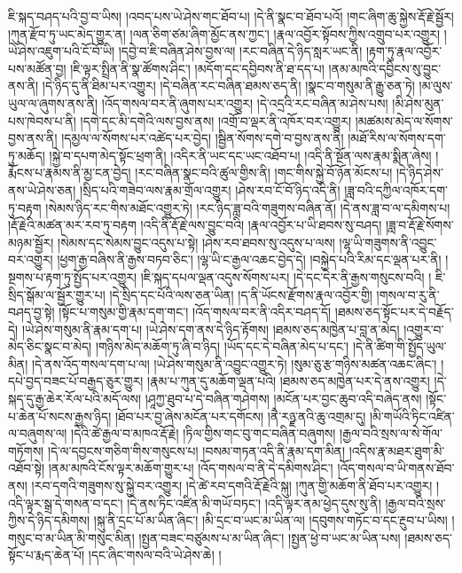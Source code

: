 ཇི་སྐད་བཤད་པའི་བྱ་བ་ཡིས། །འབད་པས་ཡེ་ཤེས་གང་ཐོབ་པ། །དེ་ནི་སྣང་བ་ཐོབ་པའོ། །གང་ཞིག་ཆུ་སྐྱེས་རྡོ་རྗེ་སྦྱོར། །ཀུན་རྫོབ་ཏུ་ཡང་མེད་གྱུར་ན། །ལན་ཅིག་ཙམ་ཞིག་མྱོང་ནས་ཀྱང་། །རྣལ་འབྱོར་སྟོབས་ཀྱིས་འགྲུབ་པར་འགྱུར། །ཡེ་ཤེས་འཇུག་པའི་ངོ་བོ་ཡི། །དབྱེ་བ་ཇི་བཞིན་ཤེས་བྱས་ལ། །རང་བཞིན་དེ་ཉིད་སླར་ཡང་ནི། །རྟག་ཏུ་རྣལ་འབྱོར་པས་མཚོན་བྱ། །ཇི་ལྟར་སྤྲིན་ནི་སྣ་ཚོགས་ཤིང་། །མདོག་དང་དབྱིབས་ནི་ཐ་དད་པ། །ནམ་མཁའི་དབྱིངས་སུ་བྱུང་ནས་ནི། །དེ་ཉིད་དུ་ནི་ཐིམ་པར་འགྱུར། །དེ་བཞིན་རང་བཞིན་ཐམས་ཅད་ནི། །སྣང་བ་གསུམ་ནི་རྒྱུ་ཅན་ཏེ། །མ་ལུས་ཡུལ་ལ་ཞུགས་ནས་ནི། །འོད་གསལ་བར་ནི་ཞུགས་པར་འགྱུར། །དེ་འདྲའི་རང་བཞིན་མ་ཤེས་པས། །མི་ཤེས་མུན་པས་ཁེབས་པ་ནི། །དགེ་དང་མི་དགེའི་ལས་བྱས་ནས། །འགྲོ་བ་ལྡར་ནི་འཁོར་བར་འགྱུར། །མཚམས་མེད་ལ་སོགས་བྱས་ནས་ནི། །དམྱལ་ལ་སོགས་པར་འཚེད་པར་བྱེད། །སྦྱིན་སོགས་དགེ་བ་བྱས་ནས་ནི། །མཐོ་རིས་ལ་སོགས་དག་ཏུ་མཆོད། །སྐྱེ་བ་དཔག་མེད་སྟོང་ཕྲག་ནི། །འདིར་ནི་ཡང་དང་ཡང་འཐོབ་པ། །འདི་ནི་སྔོན་ལས་རྣམ་སྨིན་ཞེས། །རྨོངས་པ་རྣམས་ནི་མྱ་ངན་བྱེད། །རང་བཞིན་སྣང་བའི་ཚུལ་གྱིས་ནི། །གང་གིས་སྐྱེ་བོ་ཉོན་མོངས་པ། །དེ་ཉིད་ཤེས་ནས་ཡེ་ཤེས་ཅན། །སྲིད་པའི་གཟེབ་ལས་རྣམ་གྲོལ་འགྱུར། །ཤེས་རབ་ངོ་བོ་ཉིད་འདི་ནི། །ཟླ་བའི་དཀྱིལ་འཁོར་དག་ཏུ་བརྟག །སེམས་ཉིད་རང་གིས་མཐོང་འགྱུར་ཏེ། །རང་ཉིད་ཟླ་བའི་གཟུགས་བཞིན་ནོ། །དེ་ནས་ཟླ་བ་ལ་དམིགས་པ། །རྡོ་རྗེའི་མཚན་མར་རབ་ཏུ་བརྟག །འདི་ནི་རྡོ་རྗེ་ལས་བྱུང་བའི། །རྣལ་འབྱོར་པ་ཡི་ཐབས་སུ་བཤད། །ཟླ་བ་རྡོ་རྗེ་སོགས་མཉམ་སྦྱོར། །སེམས་དང་སེམས་བྱུང་འདུས་པ་སྟེ། །ཤེས་རབ་ཐབས་སུ་འདུས་པ་ལས། །ལྷ་ཡི་གཟུགས་ནི་འབྱུང་བར་འགྱུར། །ཕྱག་རྒྱ་བཞིས་ནི་རྒྱས་བཏབ་ཅིང་། །ལྷ་ཡི་ང་རྒྱལ་འཆང་བྱེད་དེ། །བསྐྱེད་པའི་རིམ་དང་ལྡན་པར་ནི། །སྔགས་པ་རྟག་ཏུ་སྤྱོད་པར་འགྱུར། །ཇི་སྐད་དཔལ་ལྡན་འདུས་སོགས་པར། །དེ་དང་དེར་ནི་རྒྱས་གསུངས་བའི། །
 ཇི་སྲིད་སྒོམ་ལ་སྦྱོར་གྱུར་པ། །དེ་སྲིད་དང་པོའི་ལས་ཅན་ཡིན། །ད་ནི་ཡོངས་རྫོགས་རྣལ་འབྱོར་གྱི། །གསལ་བ་རུ་ནི་བཤད་བྱ་སྟེ། །སྟོང་པ་གསུམ་གྱི་རྣམ་དག་གང་། །འོད་གསལ་བར་ནི་འདིར་བཤད་དོ། །ཐམས་ཅད་སྟོང་པར་དེ་བརྗོད་དེ། །ཡེ་ཤེས་གསུམ་ནི་རྣམ་དག་པ། །ཡེ་ཤེས་དག་ནས་དེ་ཉིད་རྟོགས། །ཐམས་ཅད་མཁྱེན་པ་བླ་ན་མེད། །འགྱུར་བ་མེད་ཅིང་སྣང་བ་མེད། །གཉིས་མེད་མཆོག་ཏུ་ཞི་བ་ཉིད། །ཡོད་དང་དེ་བཞིན་མེད་པ་དང་། །དེ་ནི་ཚིག་གི་སྤྱོད་ཡུལ་མིན། །དེ་ནས་འོད་གསལ་དག་པ་ལ། །ཡེ་ཤེས་གསུམ་ནི་འབྱུང་འགྱུར་ཏེ། །སུམ་ཅུ་རྩ་གཉིས་མཚན་འཆང་ཞིང་། །དཔེ་བྱད་བཟང་པོ་བརྒྱད་ཅུར་གྱུར། །རྣམ་པ་ཀུན་དུ་མཆོག་ལྡན་པའི། །ཐམས་ཅད་མཁྱེན་པར་དེ་ནས་འགྱུར། །དེ་སྐད་དུ་རྒྱ་ཆེར་རོལ་པའི་མདོ་ལས། །ཤཱཀྱ་ཐུབ་པ་དེ་བཞིན་གཤེགས། །མངོན་པར་བྱང་ཆུབ་འདི་བཞེད་ནས། །སྟོང་པ་ཆེན་པོ་སངས་རྒྱས་ཉིད། །ཐོབ་པར་བྱ་ཞེས་མངོན་པར་དགོངས། །ནཻ་རཉྫ་ནའི་ཆུ་འགྲམ་དུ། །མི་གཡོའི་ཏིང་འཛིན་ལ་བཞུགས་ལ། །དེའི་ཚེ་རྒྱལ་བ་མཁའ་རྡོ་རྗེ། །ཏིལ་གྱིས་གང་བུ་གང་བཞིན་བཞུགས། །རྒྱལ་བའི་སྲས་ལ་སེ་གོལ་གཏོགས། །དེ་ལ་དབྱངས་གཅིག་གིས་གསུངས་པ། །བསམ་གཏན་འདི་ནི་རྣམ་དག་མིན། །འདིས་རྣ་མཐར་ཐུག་མི་འཐོབ་སྟེ། །ནམ་མཁའི་ངོས་ལྟར་མཆོག་གྱུར་པ། །འོད་གསལ་བ་ནི་དེ་དམིགས་ཤིང་། །འོད་གསལ་བ་ཡི་གནས་ཐོབ་ནས། །རབ་དགའི་གཟུགས་སུ་སྐྱེ་བར་འགྱུར། །དེ་ཚེ་རབ་དགའི་རྡོ་རྗེའི་སྐུ། །ཀུན་གྱི་མཆོག་ནི་ཐོབ་པར་འགྱུར། །འདི་ལྟར་སྒྲ་དེ་གསན་བ་དང་། །དེ་ནས་ཏིང་འཛིན་མི་གཡོ་བཏང་། །འདི་ལྟར་ནམ་ཕྱེད་དུས་སུ་ནི། །རྒྱལ་བའི་སྲས་ཀྱིས་དེ་ཉིད་དམིགས། །སྐུ་ནི་དྲང་པོ་མ་ཡིན་ཞིང་། །མི་དྲང་བ་ཡང་མ་ཡིན་ལ། །དབུགས་གཏོང་བ་དང་རྔུབ་པ་ཡིས། །གསུང་བ་མ་ཡིན་མི་གསུང་མིན། །སྤྱན་བཟང་བཙུམས་པ་མ་ཡིན་ཞིང་། །སྤྱན་ཕྱེ་བ་ཡང་མ་ཡིན་པས། །ཐམས་ཅད་སྟོང་པ་རྨད་ཆེན་པོ། །དང་ཞིང་གསལ་བའི་ཡེ་ཤེས་ཆེ། །
